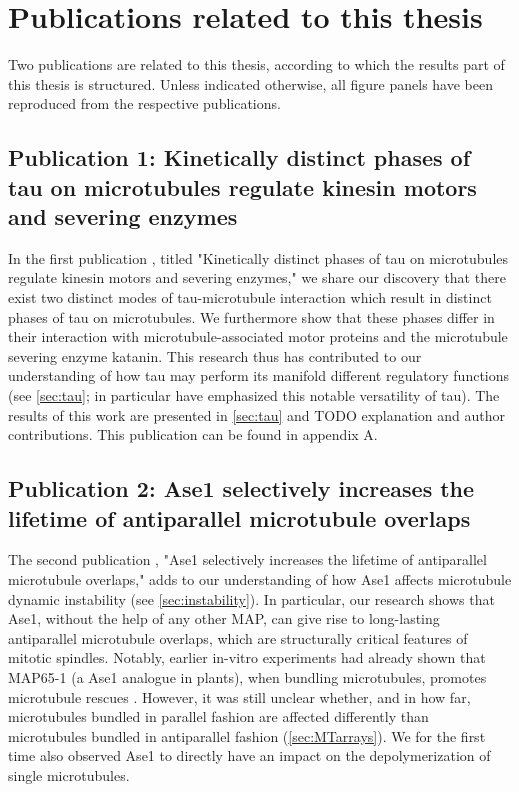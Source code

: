 \chapter{Publications related to this thesis}
\label{chap:publications}
Two publications are related to this thesis, according to which the results part of this thesis is structured. Unless indicated otherwise, all figure panels have been reproduced from the respective publications.

\section{Publication 1: Kinetically distinct phases of tau on microtubules regulate kinesin motors and severing enzymes}
In the first publication \parencite{Siahaan2019a}, titled "Kinetically distinct phases of tau on microtubules regulate kinesin motors and severing enzymes," we share our discovery that there exist two distinct modes of tau-microtubule interaction which result in distinct phases of tau on microtubules. We furthermore show that these phases differ in their interaction with microtubule-associated motor proteins and the microtubule severing enzyme katanin. This research thus has contributed to our understanding of how tau may perform its manifold different regulatory functions (see \autoref{sec:tau}; \cite{Morris2011b} in particular have emphasized this notable versatility of tau).
The results of this work are presented in \autoref{sec:tau} and 
TODO explanation and author contributions.
This publication can be found in appendix A.

\section{Publication 2: Ase1 selectively increases the lifetime of antiparallel microtubule overlaps}
The second publication \parencite{Krattenmacher2024}, "Ase1 selectively increases the lifetime of antiparallel microtubule overlaps," adds to our understanding of how Ase1 affects microtubule dynamic instability (see \autoref{sec:instability}). In particular, our research shows that Ase1, without the help of any other MAP, can give rise to long-lasting antiparallel microtubule overlaps, which are structurally critical features of mitotic spindles. Notably, earlier in-vitro experiments had already shown that MAP65-1 (a Ase1 analogue in plants), when bundling microtubules, promotes microtubule rescues \parencite{Stoppin-Mellet2013}. However, it was still unclear whether, and in how far, microtubules bundled in parallel fashion are affected differently than microtubules bundled in antiparallel fashion (\autoref{sec:MTarrays}). We for the first time also observed Ase1 to directly have an impact on the depolymerization of single microtubules. 


